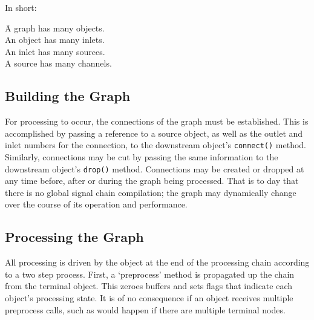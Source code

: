 \documentclass[twoside,a4paper]{article}
\begin{document}
In short:
\begin{tabbing}
\hspace{2.6cm}\=A graph has many objects.\\
	\>An object has many inlets.\\
	\>An inlet has many sources.\\
	\>A source has many channels.
\end{tabbing}



\subsection{Building the Graph} %

For processing to occur, the connections of the graph must be established.  
This is accomplished by passing a reference to a source object, as well as the outlet and inlet numbers for the connection, to the downstream object's \texttt{connect()} method.  
Similarly, connections may be cut by passing the same information to the downstream object's \texttt{drop()} method.  
Connections may be created or dropped at any time before, after or during the graph being processed.  That is to day that there is no global signal chain compilation; the graph may dynamically change over the course of its operation and performance.




\subsection{Processing the Graph} %

All processing is driven by the object at the end of the processing chain according to a two step process.  
First, a `preprocess' method is propagated up the chain from the terminal object.  
This zeroes buffers and sets flags that indicate each object's processing state.  
It is of no consequence if an object receives multiple preprocess calls, such as would happen if there are multiple terminal nodes.
\end{document}
